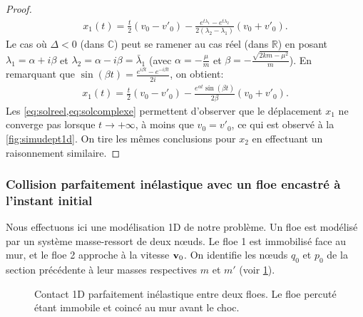 \begin{proof}
\begin{align} \label{eq:solreel}
    x_1(t) = \frac{t}{2}\left( v_0 - v'_0 \right) - \frac{e^{t\lambda_1} - e^{t\lambda_2}}{2(\lambda_2 - \lambda_1)}\left( v_0 + v'_0 \right).
\end{align}
Le cas où $\Delta < 0$ (dans $\mathbb{C}$) peut se ramener au cas réel (dans $\mathbb{R}$) en posant $\lambda_1 = \alpha + i \beta$ et $\lambda_2 = \alpha - i \beta = \bar{\lambda}_1$ (avec $\alpha = -\frac{\mu}{m}$ et $\beta = -\frac{\sqrt{2km - \mu^2}}{m}$). En remarquant que $\sin(\beta t) = \frac{e^{i\beta t} - e^{-i\beta t}}{2i}$, on obtient:
\begin{align} \label{eq:solcomplexe}
    x_1(t) = \frac{t}{2}\left( v_0 - v'_0 \right) - \frac{e^{\alpha t} \sin(\beta t)}{2\beta} \left( v_0 + v'_0 \right).
\end{align}
Les \cref{eq:solreel,eq:solcomplexe} permettent d'observer que le déplacement $x_1$ ne converge pas lorsque $t \rightarrow +\infty$, à moins que $v_0 = v'_0$, ce qui est observé à la \cref{fig:simudept1d}. On tire les mêmes conclusions pour $x_2$ en effectuant un raisonnement similaire.

\end{proof}








\subsubsection{Collision parfaitement inélastique avec un floe encastré à l'instant initial}

Nous effectuons ici une modélisation 1D de notre problème. Un floe est modélisé par un système masse-ressort de deux nœuds. Le floe 1 est immobilisé face au mur, et le floe 2 approche à la vitesse $\bm{\mathrm{v}}_0$. On identifie les nœuds $q_0$ et $p_0$ de la section précédente à leur masses respectives $m$ et $m'$ (voir \cref{fig:contact1d}).
\begin{figure}[!h]
    \centering
    \caption{Contact 1D parfaitement inélastique entre deux floes. Le floe percuté étant immobile et coincé au mur avant le choc.}
    \label{fig:contact1d}
\end{figure}

